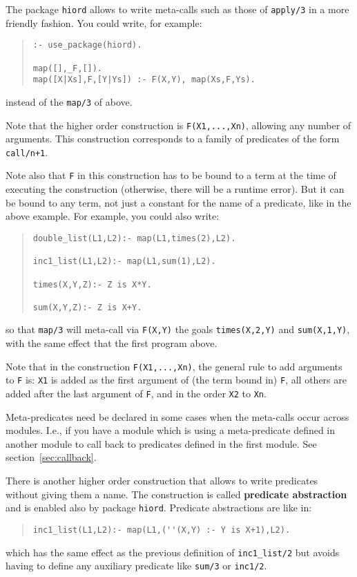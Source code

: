 The package \verb+hiord+ allows to write meta-calls such as those of
\verb+apply/3+ in a more friendly fashion. You could write, for
example:
\begin{quote}
\begin{verbatim}
:- use_package(hiord).

map([],_F,[]).
map([X|Xs],F,[Y|Ys]) :- F(X,Y), map(Xs,F,Ys).
\end{verbatim}
\end{quote}
%
instead of the \verb+map/3+ of above.

Note that the higher order construction is \verb+F(X1,...,Xn)+,
allowing any number of arguments. This construction corresponds to a
family of predicates of the form \verb-call/n+1-. 

Note also that \verb+F+ in this construction has to be bound to a term
at the time of executing the construction (otherwise, there will be a
runtime error). But it can be bound to any term, not just a constant
for the name of a predicate, like in the above example. For example,
you could also write: 
\begin{quote}
\begin{verbatim}
double_list(L1,L2):- map(L1,times(2),L2).

inc1_list(L1,L2):- map(L1,sum(1),L2).

times(X,Y,Z):- Z is X*Y.

sum(X,Y,Z):- Z is X+Y.
\end{verbatim}
\end{quote}
%
so that \verb+map/3+ will meta-call via \verb+F(X,Y)+ 
the goals \verb+times(X,2,Y)+ and \verb+sum(X,1,Y)+, with the same
effect that the first program above.

Note that in the construction \verb+F(X1,...,Xn)+, the general rule to
add arguments to \verb+F+ is: \verb+X1+ is added as the first argument
of (the term bound in) \verb+F+, all others are added after the last
argument of \verb+F+, and in the order \verb+X2+ to \verb+Xn+. 

Meta-predicates need be declared in some cases when the meta-calls
occur across modules. I.e., if you have a module which is using a
meta-predicate defined in another module to call back to predicates
defined in the first module. See section~\ref{sec:callback}.

There is another higher order construction that allows to write
predicates without giving them a name. The construction is called {\bf
  predicate abstraction} and is enabled also by package \verb+hiord+.
Predicate abstractions are like in:
\begin{quote}
\begin{verbatim}
inc1_list(L1,L2):- map(L1,(''(X,Y) :- Y is X+1),L2).
\end{verbatim}
\end{quote}
%
which has the same effect as the previous definition of
\verb+inc1_list/2+ but avoids having to define any auxiliary predicate
like \verb+sum/3+ or \verb+inc1/2+.

